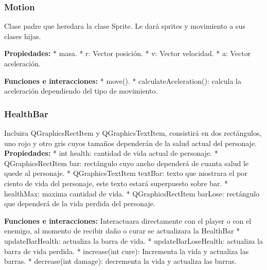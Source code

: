 \documentclass{article}
\begin{document}
\subsubsection*{Motion}
Clase padre que heredara la clase Sprite. Le dará sprites y movimiento a sus clases hijas.\newline

\subitem \textbf{Propiedades:} \newline
* masa.
* r: Vector posición.\newline
* v: Vector velocidad.\newline
* a: Vector aceleración. \newline

\subitem \textbf{Funciones e interacciones:} \newline
* move(). \newline
* calculateAceleration(): calcula la aceleración dependiendo del tipo de movimiento. \newline

\subsubsection*{HealthBar}
Incluira QGraphicsRectItem y QGraphicsTextItem, consistirá en dos rectángulos, uno rojo y otro gris cuyos tamaños dependerán de la salud actual del personaje. \newline
\subitem \textbf{Propiedades:} \newline
* int health: cantidad de vida actual de personaje.\newline
* QGraphicsRectItem bar: rectángulo cuyo ancho dependerá de cuanta salud le quede al personaje.\newline
* QGraphicsTextItem textBar: texto que mostrara el por ciento de vida del personaje, este texto estará superpuesto sobre bar. \newline
* healthMax: maxima cantidad de vida. \newline
* QGraphicsRectItem barLose: rectángulo que dependerá de la vida perdida del personaje.\newline

\subitem \textbf{Funciones e interacciones:} \newline
Interactuara directamente con el player o con el enemigo, al momento de recibir daño o curar se actualizara la HealthBar
* updateBarHealth: actualiza la barra de vida. \newline
* updateBarLoseHealth: actualiza la barra de vida perdida. \newline
* increase(int cure): Incrementa la vida y actualiza las barras. \newline
* decrease(int damage): decrementa la vida y actualiza las barras. \newline
\end{document}
